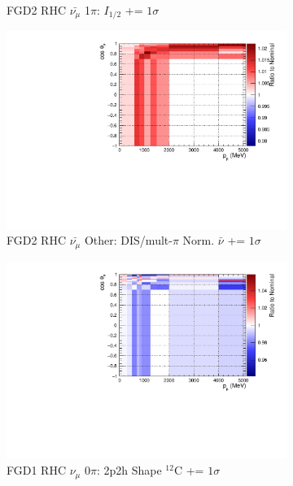 \begin{figure}
\begin{subfigure}{.32\textwidth}
  \caption{FGD2 RHC $\bar{\nu_{\mu}}$ 1$\pi$: $I_{1/2}$ += $1\sigma$}
  \label{fig:sigvar_FGD2_anti-numuCC_1pi}
\end{subfigure}
\begin{subfigure}{.32\textwidth}
  \centering
  \includegraphics[width=0.85\linewidth]{figs/sig/FGD2_anti-numuCC_other_CC_DIS_MultPi_Norm_Nubar_+1sig.pdf}
  \caption{FGD2 RHC $\bar{\nu_{\mu}}$ Other: DIS/mult-$\pi$ Norm. $\bar{\nu}$ += $1\sigma$}
  \label{fig:sigvar_FGD2_anti-numuCC_other}
\end{subfigure}
\begin{subfigure}{.32\textwidth}
  \centering
  \includegraphics[width=0.85\linewidth]{figs/sig/FGD1_NuMuBkg_CC0pi_in_AntiNu_Mode_2p2h_shape_C_+1sig.pdf}
  \caption{FGD1 RHC $\nu_{\mu}$ 0$\pi$: 2p2h Shape $^{12}$C += $1\sigma$}
  \label{fig:sigvar_FGD1_NuMuBkg_CC0pi_in_AntiNu_Mode}
\end{subfigure}
\begin{subfigure}{.32\textwidth}
  \centering

\end{subfigure}
\end{figure}
